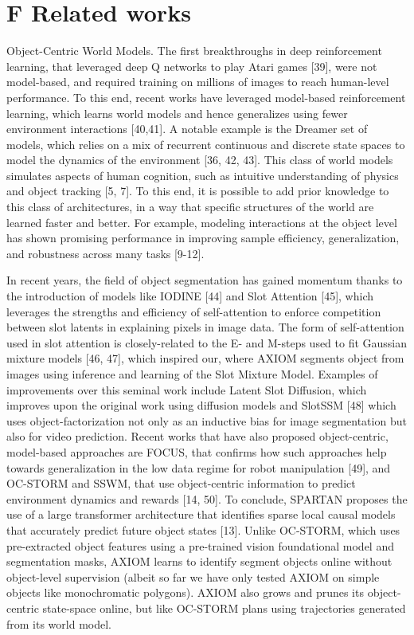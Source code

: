 \documentclass[10pt]{article}
\begin{document}
\section*{F Related works}
Object-Centric World Models. The first breakthroughs in deep reinforcement learning, that leveraged deep Q networks to play Atari games [39], were not model-based, and required training on millions of images to reach human-level performance. To this end, recent works have leveraged model-based reinforcement learning, which learns world models and hence generalizes using fewer environment interactions [40,41]. A notable example is the Dreamer set of models, which relies on a mix of recurrent continuous and discrete state spaces to model the dynamics of the environment [36, 42, 43]. This class of world models simulates aspects of human cognition, such as intuitive understanding of physics and object tracking [5, 7]. To this end, it is possible to add prior knowledge to this class of architectures, in a way that specific structures of the world are learned faster and better. For example, modeling interactions at the object level has shown promising performance in improving sample efficiency, generalization, and robustness across many tasks [9-12].

In recent years, the field of object segmentation has gained momentum thanks to the introduction of models like IODINE [44] and Slot Attention [45], which leverages the strengths and efficiency of self-attention to enforce competition between slot latents in explaining pixels in image data. The form of self-attention used in slot attention is closely-related to the E- and M-steps used to fit Gaussian mixture models [46, 47], which inspired our, where AXIOM segments object from images using inference and learning of the Slot Mixture Model. Examples of improvements over this seminal work include Latent Slot Diffusion, which improves upon the original work using diffusion models and SlotSSM [48] which uses object-factorization not only as an inductive bias for image segmentation but also for video prediction. Recent works that have also proposed object-centric, model-based approaches are FOCUS, that confirms how such approaches help towards generalization in the low data regime for robot manipulation [49], and OC-STORM and SSWM, that use object-centric information to predict environment dynamics and rewards [14, 50]. To conclude, SPARTAN proposes the use of a large transformer architecture that identifies sparse local causal models that accurately predict future object states [13]. Unlike OC-STORM, which uses pre-extracted object features using a pre-trained vision foundational model and segmentation masks, AXIOM learns to identify segment objects online without object-level supervision (albeit so far we have only tested AXIOM on simple objects like monochromatic polygons). AXIOM also grows and prunes its object-centric state-space online, but like OC-STORM plans using trajectories generated from its world model.
\end{document}
